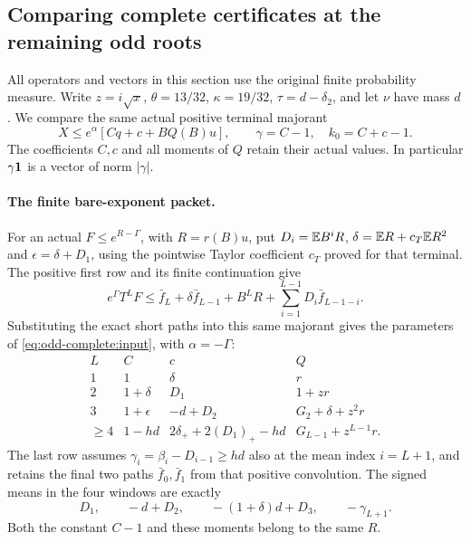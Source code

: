\subsection{Comparing complete certificates at the remaining odd roots}
\label{sec:odd-complete:comparison}

All operators and vectors in this section use the original finite
probability measure. Write $z=i\sqrt x$, $\theta=13/32$,
$\kappa=19/32$, $\tau=d-\delta_2$, and let $\nu$ have mass $d$.
We compare the same actual positive terminal majorant
\begin{equation}\label{eq:odd-complete:input}
 X\le e^\alpha[Cq+c+BQ(B)u],\qquad
 \gamma=C-1,\quad k_0=C+c-1.
\end{equation}
The coefficients $C,c$ and all moments of $Q$ retain their actual
values. In particular $\gamma\mathbf1$ is a vector of norm $|\gamma|$.

\paragraph{The finite bare-exponent packet.}
For an actual $F\le e^{R-\Gamma}$, with $R=r(B)u$, put
$D_i=\mathbb E B^iR$, $\delta=\mathbb E R+c_T\mathbb E R^2$ and
$\epsilon=\delta+D_1$, using the pointwise Taylor coefficient
$c_T$ proved for that terminal.
The positive first row and its finite continuation give
\[
 e^\Gamma T^LF\le\bar f_L+\delta\bar f_{L-1}+B^LR
                    +\sum_{i=1}^{L-1}D_i\bar f_{L-1-i}.
\]
Substituting the exact short paths into this same majorant gives
the parameters of \eqref{eq:odd-complete:input}, with $\alpha=-\Gamma$:
\begin{equation}\label{eq:odd-even:rows}
\begin{array}{c|c|c|c}
 L&C&c&Q\\\hline
 1&1&\delta&r\\
 2&1+\delta&D_1&1+zr\\
 3&1+\epsilon&-d+D_2&G_2+\delta+z^2r\\
 \ge4&1-hd&2\delta_++2(D_1)_+-hd&G_{L-1}+z^{L-1}r.
\end{array}
\end{equation}
The last row assumes $\gamma_i=\beta_i-D_{i-1}\ge hd$ also
at the mean index $i=L+1$, and retains the final two paths
$\bar f_0,\bar f_1$ from that positive convolution. The signed
means in the four windows are exactly
\begin{equation}\label{eq:odd-complete:bare-means}
 D_1,\qquad -d+D_2,\qquad -(1+\delta)d+D_3,\qquad
 -\gamma_{L+1}.
\end{equation}
Both the constant $C-1$ and these moments belong to the same $R$.

